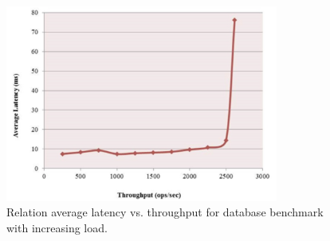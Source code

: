 \begin{figure}[H]
    \centering
    \includegraphics[width=0.8\textwidth]{chapter-evaluation/ls_vs_th}
    \caption{Relation average latency vs. throughput for database benchmark with increasing load.~\cite{latvsthrough}}
    \label{fig:ls_vs_tp}
\end{figure}